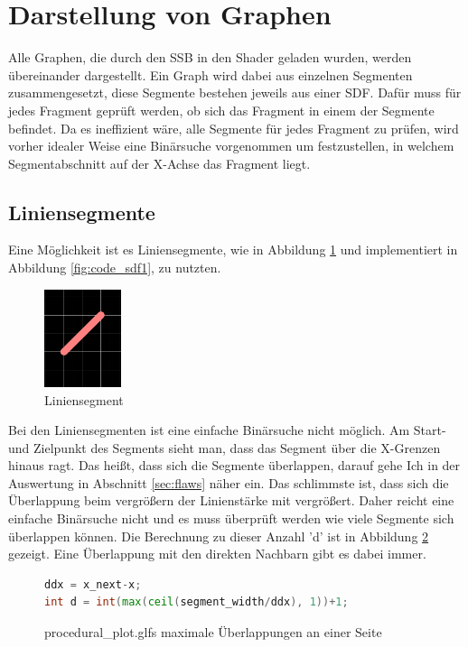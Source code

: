 \section{Darstellung von Graphen}
\label{sec:binary}
Alle Graphen, die durch den SSB in den Shader geladen wurden, werden übereinander dargestellt.
Ein Graph wird dabei aus einzelnen Segmenten zusammengesetzt, diese Segmente bestehen jeweils aus einer SDF.
Dafür muss für jedes Fragment geprüft werden, ob sich das Fragment in einem der Segmente befindet.
Da es ineffizient wäre, alle Segmente für jedes Fragment zu prüfen, wird vorher idealer Weise eine Binärsuche vorgenommen um festzustellen, in welchem Segmentabschnitt auf der X-Achse das Fragment liegt.
\subsection{Liniensegmente}
Eine Möglichkeit ist es Liniensegmente, wie in Abbildung \ref{fig:linie} und implementiert in Abbildung \ref{fig:code_sdf1}, zu nutzten.
\begin{figure}[ht]
	\centering
	\includegraphics[width=0.2\textwidth]{fig/linie.png}
	\caption{Liniensegment}
	\label{fig:linie}
\end{figure}
\FloatBarrier
Bei den Liniensegmenten ist eine einfache Binärsuche nicht möglich.
Am Start- und Zielpunkt des Segments sieht man, dass das Segment über die X-Grenzen hinaus ragt.
Das heißt, dass sich die Segmente überlappen, darauf gehe Ich in der Auswertung in Abschnitt \ref{sec:flaws} näher ein.
Das schlimmste ist, dass sich die Überlappung beim vergrößern der Linienstärke mit vergrößert.
Daher reicht eine einfache Binärsuche nicht und es muss überprüft werden wie viele Segmente sich überlappen können.
Die Berechnung zu dieser Anzahl 'd' ist in Abbildung \ref{fig:code_overlap} gezeigt.
Eine Überlappung mit den direkten Nachbarn gibt es dabei immer.
\begin{figure}[ht]
	\begin{lstlisting}[language=GLSL]
ddx = x_next-x;
int d = int(max(ceil(segment_width/ddx), 1))+1;
	\end{lstlisting}
	\caption{procedural\_plot.glfs maximale Überlappungen an einer Seite}
	\label{fig:code_overlap}
\end{figure}
\FloatBarrier


